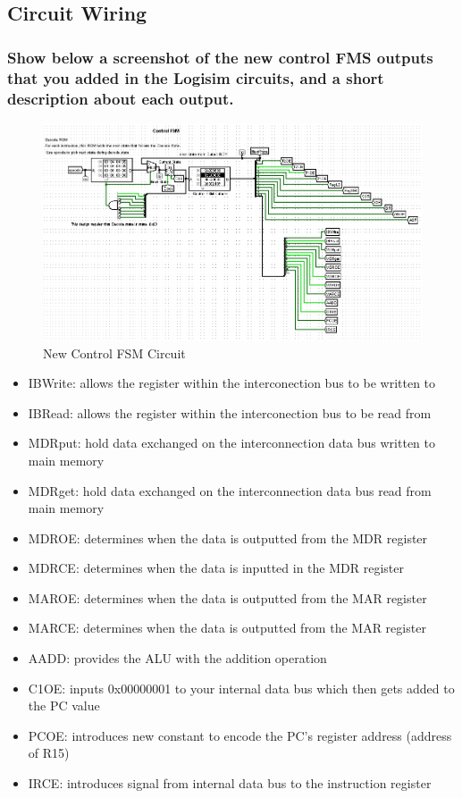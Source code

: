 \documentclass{article}
\begin{document}
	\pagebreak

	\subsection{Circuit Wiring}
	\subsubsection{Show below a screenshot of the new control FMS outputs that you added in the Logisim circuits, and a short description about each output.}
	\begin{figure}[!ht]
		\centering
		\includegraphics[width=\linewidth]{fsm_circuit_part2}
		\caption{New Control FSM Circuit}
	\end{figure}
	
	\begin{itemize}
		\item IBWrite: allows the register within the interconection bus to be written to
		\item IBRead: allows the register within the interconection bus to be read from
		\item MDRput: hold data exchanged on the interconnection data bus written to main memory
		\item MDRget: hold data exchanged on the interconnection data bus read from main memory
		\item MDROE: determines when the data is outputted from the MDR register
		\item MDRCE: determines when the data is inputted in the MDR register
		\item MAROE: determines when the data is outputted from the MAR register
		\item MARCE: determines when the data is outputted from the MAR register
		\item AADD: provides the ALU with the addition operation
		\item C1OE: inputs 0x00000001 to your internal data bus which then gets added to the PC value
		\item PCOE: introduces new constant to encode the PC's register address (address of R15)
		\item IRCE: introduces signal from internal data bus to the instruction register
	\end{itemize}
\end{document}
